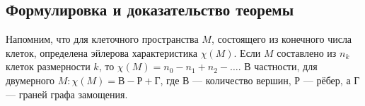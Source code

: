 \documentclass[a4paper]{report}
\begin{document}
    \subsection{Формулировка и доказательство теоремы}
%
%
%
%
    Напомним, что для клеточного пространства $M$, состоящего из конечного числа клеток, определена эйлерова характеристика $\chi(M)$.
    Если $M$ составлено из $n_k$ клеток размерности $k$, то $\chi(M) = n_0 - n_1 + n_2 - \dots$.
    В частности, для двумерного $M: \chi(M) = \text{В} - \text{Р} + \text{Г}$, где $\text{В}$ --- количество вершин, $\text{Р}$ --- рёбер, а $\text{Г}$ --- граней графа замощения.
\end{document}
